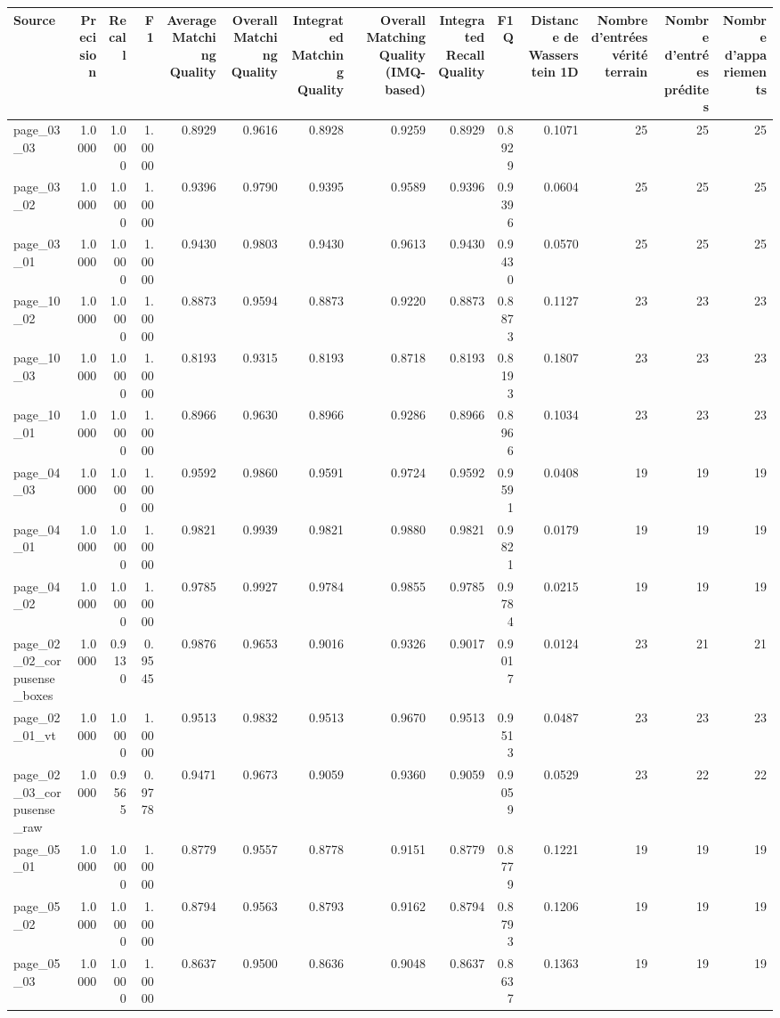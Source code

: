 \begin{tabular}{lrrrrrrrrrrrrr}
\toprule
Source & Precision & Recall & F1 & Average Matching Quality & Overall Matching Quality & Integrated Matching Quality & Overall Matching Quality (IMQ-based) & Integrated Recall Quality & F1Q & Distance de Wasserstein 1D & Nombre d'entrées vérité terrain & Nombre d'entrées prédites & Nombre d'appariements \\
\midrule
page\_03\_03 & 1.0000 & 1.0000 & 1.0000 & 0.8929 & 0.9616 & 0.8928 & 0.9259 & 0.8929 & 0.8929 & 0.1071 & 25 & 25 & 25 \\
page\_03\_02 & 1.0000 & 1.0000 & 1.0000 & 0.9396 & 0.9790 & 0.9395 & 0.9589 & 0.9396 & 0.9396 & 0.0604 & 25 & 25 & 25 \\
page\_03\_01 & 1.0000 & 1.0000 & 1.0000 & 0.9430 & 0.9803 & 0.9430 & 0.9613 & 0.9430 & 0.9430 & 0.0570 & 25 & 25 & 25 \\
page\_10\_02 & 1.0000 & 1.0000 & 1.0000 & 0.8873 & 0.9594 & 0.8873 & 0.9220 & 0.8873 & 0.8873 & 0.1127 & 23 & 23 & 23 \\
page\_10\_03 & 1.0000 & 1.0000 & 1.0000 & 0.8193 & 0.9315 & 0.8193 & 0.8718 & 0.8193 & 0.8193 & 0.1807 & 23 & 23 & 23 \\
page\_10\_01 & 1.0000 & 1.0000 & 1.0000 & 0.8966 & 0.9630 & 0.8966 & 0.9286 & 0.8966 & 0.8966 & 0.1034 & 23 & 23 & 23 \\
page\_04\_03 & 1.0000 & 1.0000 & 1.0000 & 0.9592 & 0.9860 & 0.9591 & 0.9724 & 0.9592 & 0.9591 & 0.0408 & 19 & 19 & 19 \\
page\_04\_01 & 1.0000 & 1.0000 & 1.0000 & 0.9821 & 0.9939 & 0.9821 & 0.9880 & 0.9821 & 0.9821 & 0.0179 & 19 & 19 & 19 \\
page\_04\_02 & 1.0000 & 1.0000 & 1.0000 & 0.9785 & 0.9927 & 0.9784 & 0.9855 & 0.9785 & 0.9784 & 0.0215 & 19 & 19 & 19 \\
page\_02\_02\_corpusense\_boxes & 1.0000 & 0.9130 & 0.9545 & 0.9876 & 0.9653 & 0.9016 & 0.9326 & 0.9017 & 0.9017 & 0.0124 & 23 & 21 & 21 \\
page\_02\_01\_vt & 1.0000 & 1.0000 & 1.0000 & 0.9513 & 0.9832 & 0.9513 & 0.9670 & 0.9513 & 0.9513 & 0.0487 & 23 & 23 & 23 \\
page\_02\_03\_corpusense\_raw & 1.0000 & 0.9565 & 0.9778 & 0.9471 & 0.9673 & 0.9059 & 0.9360 & 0.9059 & 0.9059 & 0.0529 & 23 & 22 & 22 \\
page\_05\_01 & 1.0000 & 1.0000 & 1.0000 & 0.8779 & 0.9557 & 0.8778 & 0.9151 & 0.8779 & 0.8779 & 0.1221 & 19 & 19 & 19 \\
page\_05\_02 & 1.0000 & 1.0000 & 1.0000 & 0.8794 & 0.9563 & 0.8793 & 0.9162 & 0.8794 & 0.8793 & 0.1206 & 19 & 19 & 19 \\
page\_05\_03 & 1.0000 & 1.0000 & 1.0000 & 0.8637 & 0.9500 & 0.8636 & 0.9048 & 0.8637 & 0.8637 & 0.1363 & 19 & 19 & 19 \\
\bottomrule
\end{tabular}
